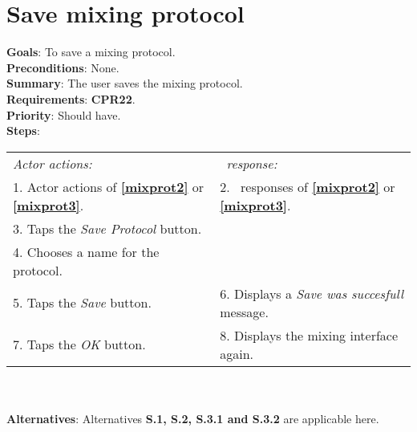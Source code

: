   \section{Save mixing protocol}
  \label{saveprot}
  \textbf{Goals}: To save a mixing protocol.\\
  \textbf{Preconditions}: None. \\
  \textbf{Summary}: The user saves the mixing protocol.\\
  \textbf{Requirements}: \textbf{CPR22}.\\
  \textbf{Priority}: Should have.\\
  \textbf{Steps}: \\
  \begin{tabular}{ p{} p{} }
  	\emph{Actor actions:} & \emph{\projectname\ response:} \\
  	1. Actor actions of \textbf{\ref{mixprot2}} or \textbf{\ref{mixprot3}}. & 2. \projectname\ responses of \textbf{\ref{mixprot2}} or \textbf{\ref{mixprot3}}. \\
    3. Taps the \emph{Save Protocol} button.  & \\
    4. Chooses a name for the protocol. & \\
    5. Taps the \emph{Save} button. & 6. Displays a \emph{Save was succesfull} message.\\
    7. Taps the \emph{OK} button. & 8. Displays the mixing interface again. \\
      \end{tabular}
    	 \\
    \\\textbf{Alternatives}: Alternatives \textbf{S.1, S.2, S.3.1 and S.3.2} are applicable here.

